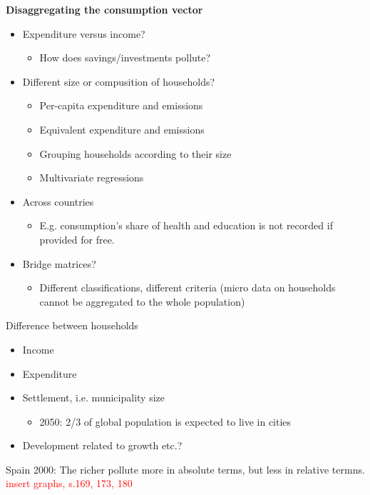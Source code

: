 \begin{multicols}{2}
\textbf{Disaggregating the consumption vector}\\
\begin{itemize}
  \item Expenditure versus income?
  \begin{itemize}
    \item  How does savings/investments pollute?
  \end{itemize}
  \item Different size or compusition of households?
  \begin{itemize}
    \item Per-capita expenditure and emissions
    \item Equivalent expenditure and emissions
    \item Grouping households according to their size
    \item Multivariate regressions
  \end{itemize}
  \item Across countries
  \begin{itemize}
    \item E.g. consumption's share of health and education is not recorded if provided for free.
  \end{itemize}
  \item Bridge matrices?
  \begin{itemize}
    \item Different classifications, different criteria (micro data on households cannot be aggregated to the whole population)
  \end{itemize}
\end{itemize}
Difference between households
\begin{itemize}
  \item Income
  \item Expenditure
  \item Settlement, i.e. municipality size
  \begin{itemize}
    \item 2050: 2/3 of global population is expected to live in cities
  \end{itemize}
  \item Development related to growth etc.?
\end{itemize}
\end{multicols}\noindent
Spain 2000: The richer pollute more in absolute terms, but less in relative termns.
\textcolor{red}{insert graphs, s.169, 173, 180}
